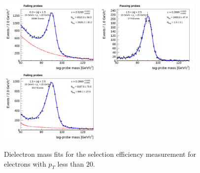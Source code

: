 \begin{figure}[!htbp]
\begin{center}
\includegraphics[width=0.45\textwidth]{figures/ElectronSelectionEffMassFitFail_EtaPtBin2.pdf}
\includegraphics[width=0.45\textwidth]{figures/ElectronSelectionEffMassFitPass_EtaPtBin3.pdf}
\includegraphics[width=0.45\textwidth]{figures/ElectronSelectionEffMassFitFail_EtaPtBin3.pdf}
\caption{Dielectron mass fits for the selection efficiency measurement for electrons with
$p_{T}$ less than $20$\GeV.}
\label{fig:ele_selectionEfficiency_massfits_lowPt}
\end{center}
\end{figure}

\newpage 

